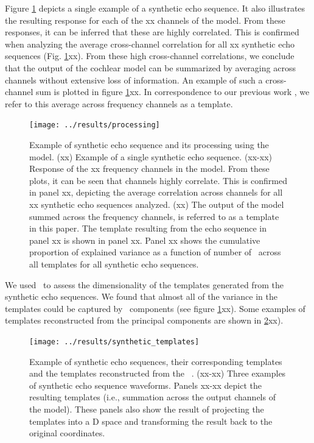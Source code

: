 \documentclass[preprint,5p]{elsarticle}
\begin{document}
Figure \ref{fig:processing} depicts a single example of a synthetic echo sequence. It also illustrates the resulting response for each of the xx channels of the \citet{Wiegrebe2008} model. From these responses, it can be inferred that these are highly correlated. This is confirmed when analyzing the average cross-channel correlation for all xx synthetic echo sequences (Fig. \ref{fig:processing}xx). From these high cross-channel correlations, we conclude that the output of the cochlear model can be summarized by averaging across channels without extensive loss of information. An example of such a cross-channel sum is plotted in figure \ref{fig:processing}xx. In correspondence to our previous work \citep{Vanderelst2016}, we refer to this average across frequency channels as a template.

\begin{figure}[tb]
	\centering
	\texttt{[image: ../results/processing]}
	\caption{Example of synthetic echo sequence and its processing using the \citet{Wiegrebe2008} model. (xx) Example of a single synthetic echo sequence. (xx-xx) Response of the xx frequency channels in the \citet{Wiegrebe2008} model. From these plots, it can be seen that channels highly correlate. This is confirmed in panel xx, depicting the average correlation across channels for all xx synthetic echo sequences analyzed. (xx) The output of the \citet{Wiegrebe2008} model summed across the frequency channels, is referred to as a template in this paper. The template resulting from the echo sequence in panel xx is shown in panel xx. Panel xx shows the cumulative proportion of explained variance as a function of number of \pc\ across all templates for all synthetic echo sequences.}
	\label{fig:processing}
\end{figure}

We used \PCA\ to assess the dimensionality of the templates generated from the synthetic echo sequences. We found that almost all of the variance in the templates could be captured by \pca\ components (see figure \ref{fig:processing}xx). Some examples of templates reconstructed from the principal components are shown in \ref{fig:synthetictemplates}xx).

\begin{figure}[tb]
	\centering
	\texttt{[image: ../results/synthetic\_templates]}
	\caption{Example of synthetic echo sequences, their corresponding templates and the templates reconstructed from the \pca\ \pcs. (xx-xx) Three examples of synthetic echo sequence waveforms. Panels xx-xx depict the resulting templates (i.e., summation across the output channels of the \citet{Wiegrebe2008} model). These panels also show the result of projecting the templates into a \pca D space and transforming the result back to the original coordinates.}
	\label{fig:synthetictemplates}
\end{figure}
\end{document}
